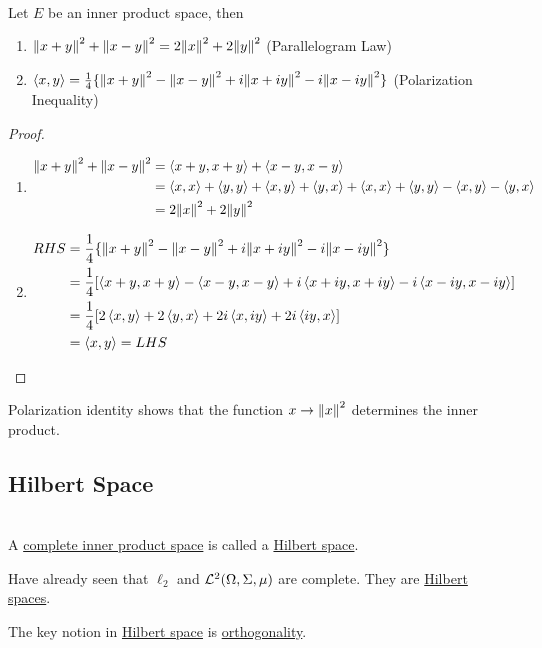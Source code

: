 \begin{proposition}\ \\
Let $E$ be an inner product space, then 
\begin{enumerate}[label = (\alph*)]
    \item $\norm{x + y}^2 + \norm{x - y}^2 = 2\norm{x}^2 + 2 \norm{y}^2$ (Parallelogram Law)
    \item $\left\langle x, y \right\rangle = \frac{1}{4} \{\norm{x + y}^2 - \norm{x - y}^2 + i \norm{x + iy}^2 - i \norm{x - iy}^2\}$ (Polarization Inequality)
\end{enumerate}
\end{proposition}
\begin{proof}\
\begin{enumerate}[label = (\alph*)]
    \item \begin{align*}
        \norm{x+y}^2 + \norm{x - y}^2 &= \left\langle x + y,  x + y \right\rangle + \left\langle x - y, x - y \right\rangle\\
        &= \left\langle x, x \right\rangle + \left\langle y, y \right\rangle +  \left\langle x, y \right\rangle + \left\langle y, x \right\rangle + \left\langle x, x \right\rangle + \left\langle y, y \right\rangle - \left\langle x, y \right\rangle - \left\langle y, x \right\rangle\\
        &= 2 \norm{x}^2 + 2 \norm{y}^2
    \end{align*}
    \item \begin{align*}
        RHS &= \frac{1}{4} \{\norm{x + y}^2 - \norm{x - y}^2 + i \norm{x + iy}^2 - i \norm{x - iy}^2\}\\
        &= \frac{1}{4} [\left\langle x+y, x+y \right\rangle - \left\langle x - y, x - y \right\rangle + i \left\langle x + iy, x + iy \right\rangle - i \left\langle x - iy, x - iy \right\rangle]\\
        &= \frac{1}{4}[2 \left\langle x, y \right\rangle  + 2 \left\langle y, x \right\rangle + 2i\left\langle x, iy \right\rangle + 2 i \left\langle iy, x \right\rangle]\\
        &= \left\langle x, y \right\rangle = LHS
    \end{align*}
\end{enumerate}
\end{proof}
\begin{remark}
    Polarization identity shows that the function $x \to \norm{x}^2$ determines the inner product.
\end{remark}


\vspace{12pt}
\subsection{Hilbert Space}
\begin{definition}\ \\
A \underline{complete inner product space} is called a \underline{Hilbert space}. 
\end{definition}
\begin{remark}
    Have already seen that $\ell_2$ and $\mathcal{L}^2 (\Omega,\Sigma,\mu)$ are complete. They are \underline{Hilbert spaces}.
\end{remark}
\begin{remark}
    The key notion in \underline{Hilbert space} is \underline{orthogonality}.
\end{remark}

